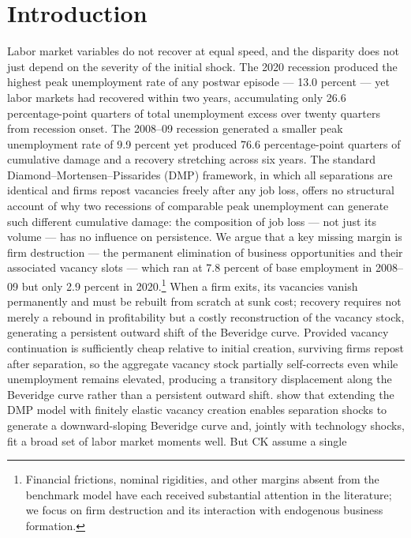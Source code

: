 \documentclass[authoryear, review, 12pt]{elsarticle}
\begin{document}
	\section{Introduction}\label{sec:introduction}
	
	Labor market variables do not recover at equal speed, and the 
	disparity does not just depend on the severity of the initial shock. 
	The 2020 recession produced the highest peak unemployment rate of 
	any postwar episode --- 13.0 percent --- yet labor markets had 
	recovered within two years, accumulating only 26.6 percentage-point 
	quarters of total unemployment excess over twenty quarters from 
	recession onset. The 2008--09 recession generated a smaller peak unemployment rate of 9.9 percent yet produced 76.6 percentage-point 
	quarters of cumulative damage and a recovery stretching across six 
	years. The standard Diamond--Mortensen--Pissarides (DMP) framework, 
	in which all separations are identical and firms repost vacancies 
	freely after any job loss, offers no structural account of why two 
	recessions of comparable peak unemployment can generate such 
	different cumulative damage: the composition of job loss --- not 
	just its volume --- has no influence on persistence. We argue that a 
	key missing margin is firm destruction --- the permanent elimination 
	of business opportunities and their associated vacancy slots --- 
	which ran at 7.8 percent of base employment in 2008--09 but only 
	2.9 percent in 2020.\footnote{Financial frictions, nominal 
		rigidities, and other margins absent from the benchmark model have 
		each received substantial attention in the literature; we focus on 
		firm destruction and its interaction with endogenous business 
		formation.} When a firm exits, its vacancies vanish permanently and 
	must be rebuilt from scratch at sunk cost; recovery requires not 
	merely a rebound in profitability but a costly reconstruction of the 
	vacancy stock, generating a persistent outward shift of the 
	Beveridge curve. Provided vacancy continuation is sufficiently cheap  relative to initial creation, surviving firms repost after separation, so the aggregate vacancy stock partially self-corrects even while unemployment remains elevated, producing a transitory displacement along the Beveridge curve rather than a persistent  outward shift.	
	\citet{coles_2018} show that extending the DMP model with finitely 
	elastic vacancy creation enables separation shocks to generate a 
	downward-sloping Beveridge curve and, jointly with technology shocks, 
	fit a broad set of labor market moments well. But CK assume a single 
\end{document}
